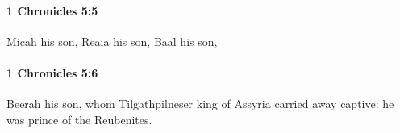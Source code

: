 		\paragraph{1 Chronicles 5:5} %
			\label{1CHRONICLES-5-5}

			Micah his son, Reaia his son, Baal his son,


		\paragraph{1 Chronicles 5:6} %
			\label{1CHRONICLES-5-6}

			Beerah his son, whom Tilgathpilneser king of Assyria carried away captive: he was prince of the Reubenites.


